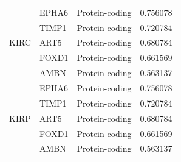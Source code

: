 \begin{table}
\begin{center}
{\begin{tabular}{l|l|l|l}
        \midrule
        \multirow{5}{*}{KIRC}& EPHA6 & Protein-coding & 0.756078 \\ %
        & TIMP1 & Protein-coding & 0.720784 \\ %
        & ART5 & Protein-coding & 0.680784 \\ %
        & FOXD1 & Protein-coding & 0.661569 \\ %
        & AMBN & Protein-coding & 0.563137 \\ %
        \midrule
        \multirow{5}{*}{KIRP}& EPHA6 & Protein-coding & 0.756078 \\ %
        & TIMP1 & Protein-coding & 0.720784 \\ %
        & ART5 & Protein-coding & 0.680784 \\ %
        & FOXD1 & Protein-coding & 0.661569 \\ %
        & AMBN & Protein-coding & 0.563137 \\ %
        \midrule
        \bottomrule
        \end{tabular}}
        \vspace{-4mm}
    \end{center}
\end{table}

